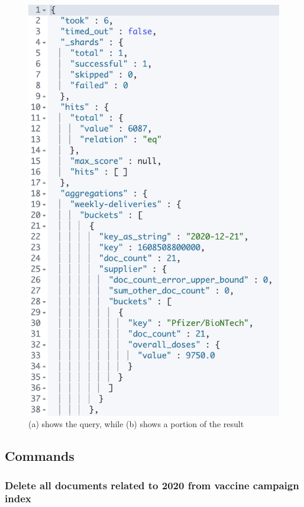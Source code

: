 \documentclass{article}[IEEEtran]
\begin{document}
\begin{figure}[H]
\begin{center}
\begin{minipage}[b]{0.4\textwidth}
    \includegraphics[width=\textwidth, frame]{Answer_Query_12.PNG}
     \subcaption{}
  \end{minipage}
  \caption{(a) shows the query, while (b) shows a portion of the result}
\end{center}
\end{figure}

\subsection{Commands}

\subsubsection{Delete all documents related to 2020 from vaccine campaign index}
\end{document}
